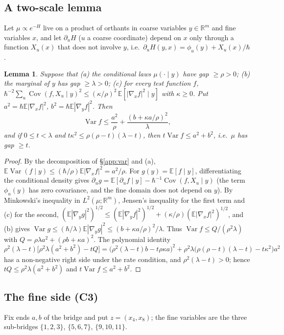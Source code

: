 \documentclass[11pt,a4paper]{article}
\newtheorem{lemma}[theorem]{Lemma}
\theoremstyle{definition}
\theoremstyle{remark}
\newcommand{\E}{\mathbb{E}}
\DeclareMathOperator{\Cov}{Cov}
\DeclareMathOperator{\Var}{Var}
\begin{document}
\subsection{A two-scale lemma}\label{app:lemma}
Let $\mu\propto e^{-H}$ live on a product of orthants in coarse variables $y\in\mathbb R^m$ and fine variables $x$, and let $\partial_uH$ ($u$ a coarse coordinate) depend on $x$ only through a function $X_u(x)$ that does not involve $y$, i.e.\ $\partial_uH(y,x)=\phi_u(y)+X_u(x)/\hbar$.

\begin{lemma}\label{lem:twoscale}
Suppose that (a) the conditional laws $\mu(\cdot\mid y)$ have gap $\ge\rho>0$; (b) the marginal of $y$ has gap $\ge\lambda>0$; (c) for every test function $f$, $\hbar^{-2}\sum_u\Cov(f,X_u\mid y)^2\le(\kappa/\rho)^2\,\E[|\nabla_xf|^2\mid y]$ with $\kappa\ge0$. Put $a^2=\hbar\E|\nabla_xf|^2$, $b^2=\hbar\E|\nabla_yf|^2$. Then
\[
\Var f\le\frac{a^2}{\rho}+\frac{(b+\kappa a/\rho)^2}{\lambda},
\]
and if $0\le t<\lambda$ and $t\kappa^2\le\rho(\rho-t)(\lambda-t)$, then $t\Var f\le a^2+b^2$, i.e.\ $\mu$ has gap $\ge t$.
\end{lemma}

\begin{proof}
By the decomposition of \S\ref{app:var} and (a), $\E\Var(f\mid y)\le(\hbar/\rho)\E|\nabla_xf|^2=a^2/\rho$. For $g(y)=\E[f\mid y]$, differentiating the conditional density gives $\partial_ug=\E[\partial_uf\mid y]-\hbar^{-1}\Cov(f,X_u\mid y)$ (the term $\phi_u(y)$ has zero covariance, and the fine domain does not depend on $y$). By Minkowski's inequality in $L^2(\mu;\mathbb R^m)$, Jensen's inequality for the first term and (c) for the second, $(\E|\nabla_yg|^2)^{1/2}\le(\E|\nabla_yf|^2)^{1/2}+(\kappa/\rho)(\E|\nabla_xf|^2)^{1/2}$, and (b) gives $\Var g\le(\hbar/\lambda)\E|\nabla_yg|^2\le(b+\kappa a/\rho)^2/\lambda$. Thus $\Var f\le Q/(\rho^2\lambda)$ with $Q=\rho\lambda a^2+(\rho b+\kappa a)^2$. The polynomial identity
\[
\rho^2(\lambda-t)\bigl[\rho^2\lambda(a^2+b^2)-tQ\bigr]=\bigl(\rho^2(\lambda-t)b-t\rho\kappa a\bigr)^2+\rho^2\lambda\bigl(\rho(\rho-t)(\lambda-t)-t\kappa^2\bigr)a^2
\]
has a non-negative right side under the rate condition, and $\rho^2(\lambda-t)>0$; hence $tQ\le\rho^2\lambda(a^2+b^2)$ and $t\Var f\le a^2+b^2$.
\end{proof}

\subsection{The fine side (C3)}\label{app:fine}
Fix ends $a,b$ of the bridge and put $z=(x_4,x_8)$; the fine variables are the three sub-bridges $\{1,2,3\}$, $\{5,6,7\}$, $\{9,10,11\}$.
\end{document}
